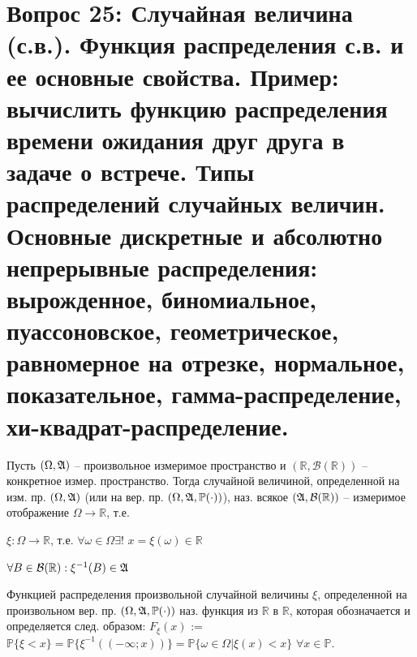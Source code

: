 \section{Вопрос 25: Случайная величина (с.в.). Функция распределения с.в. и ее основные свойства. Пример: вычислить функцию распределения времени ожидания друг друга в задаче о встрече. Типы распределений случайных величин. Основные дискретные и абсолютно непрерывные распределения: вырожденное, биномиальное, пуассоновское, геометрическое, равномерное на отрезке, нормальное, показательное, гамма-распределение, хи-квадрат-распределение.}

\begin{defs}
	Пусть $(\Omega, \mathfrak{A})$ -- произвольное измеримое пространство и $(\mathbb{R}, \mathcal{B}(\mathbb{R}))$ -- конкретное измер. пространство.
	Тогда случайной величиной, определенной на изм. пр. $(\Omega, \mathfrak{A})$ (или на вер. пр. $(\Omega, \mathfrak{A}, \mathbb{P}(\cdot))$), наз. всякое
	$(\mathfrak{A}, \mathcal{B}(\mathbb{R}))$ -- измеримое отображение $\Omega \to \mathbb{R}$, т.е.
	\begin{enumerate*}
	\item $\xi:\Omega \to \mathbb{R}$, т.е. $\forall \omega \in \Omega \exists$! $x=\xi(\omega) \in \mathbb{R}$
	\item $\forall B \in \mathcal{B}(\mathbb{R}): \xi^{-1}(B)\in \mathfrak{A}$
	\end{enumerate*}
\end{defs}

\begin{defs}
	Функцией распределения произвольной случайной величины $\xi$, определенной на произвольном вер. пр.  $(\Omega, \mathfrak{A}, \mathbb{P}(\cdot))$ наз. функция из $\mathbb{R}$ в $\mathbb{R}$,
	которая обозначается и определяется след. образом:
	$F_{\xi}(x)$ := $\mathbb{P} \{ \xi < x \} = \mathbb{P}\{\xi^{-1}((-\infty;x))\} = \mathbb{P}\{\omega \in \Omega| \xi(x) < x\}$ $\forall x \in \mathbb{P}$.
\end{defs}

